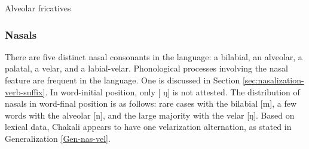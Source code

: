 
\begin{table}[!htb] \small
\centering
\caption{Alveolar  fricatives\label{tab:alveolar-fricatives}}

\quad
{}


\end{table}


\subsubsection{Nasals}
\label{sec:PHON-nasal}

There are  five distinct nasal consonants in the language: a bilabial, an 
alveolar, a 
palatal, a velar, and a labial-velar. Phonological processes involving the 
nasal feature are frequent in the language. One is discussed in Section 
\ref{sec:nasalization-verb-suffix}.  In word-initial position,  only  [{\sls 
ŋ}] 
is not attested. The distribution of nasals in word-final position is as 
follows:  rare cases with the bilabial [{\sls m}], a few words with the 
alveolar [{\sls n}], and the large majority with the velar [{\sls ŋ}].  Based on
lexical data,  Chakali appears to have one velarization alternation, as 
stated in Generalization \ref{Gen-nas-vel}.


